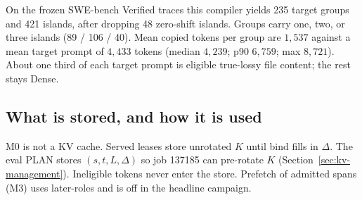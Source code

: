 On the frozen SWE-bench Verified traces this compiler yields 235 target
groups and 421 islands, after dropping 48 zero-shift islands. Groups
carry one, two, or three islands (89 / 106 / 40). Mean copied tokens
per group are $1{,}537$ against a mean target prompt of $4{,}433$ tokens
(median $4{,}239$; p90 $6{,}759$; max $8{,}721$). About one third of each
target prompt is eligible true-lossy file content; the rest stays Dense.

\subsection{What is stored, and how it is used}

M0 is not a KV cache. Served leases store unrotated $K$ until bind
fills in $\Delta$. The eval PLAN stores $(s,t,L,\Delta)$ so job 137185
can pre-rotate $K$ (Section~\ref{sec:kv-management}). Ineligible tokens
never enter the store. Prefetch of admitted spans (M3) uses later-roles
and is off in the headline campaign.
\FloatBarrier
